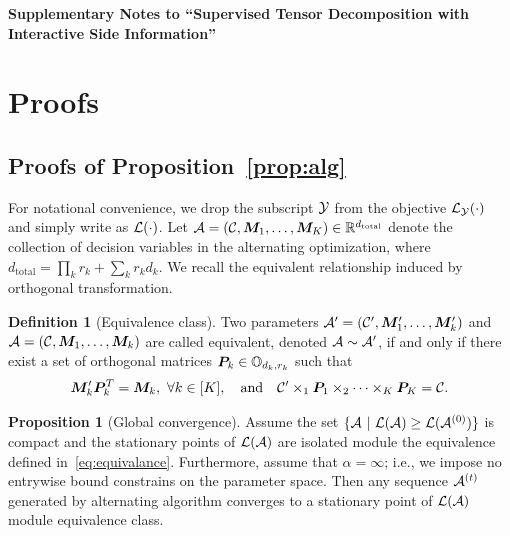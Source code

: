 \documentclass[12pt]{article}
\theoremstyle{definition}
\newtheorem{prop}{Proposition}
\theoremstyle{definition}
\newtheorem{defn}{Definition}
\begin{document}
\def\spacingset#1{\renewcommand{\baselinestretch}%
{#1}\small\normalsize} \spacingset{1.5}



\begin{center}
{\Large\bf Supplementary Notes to ``Supervised Tensor Decomposition
with Interactive Side Information''}
\end{center}

\appendix
\renewcommand{\thefigure}{S\arabic{figure}}
\setcounter{figure}{0}   

\section{Proofs}\label{sec:appedix}


\subsection{Proofs of Proposition~\ref{prop:alg}}\label{sec:SAlgorithm}
For notational convenience, we drop the subscript $\mathcal{Y}$ from the objective $\mathcal{L}_{\mathcal{Y}}(\cdot)$ and simply write as $\mathcal{L}(\cdot)$. Let $\mathcal{A} = (\mathcal{C}, \bm M_1,\ldots,\bm M_K) \in \mathbb{R}^{d_{\text{total}}}$ denote the collection of decision variables in the alternating optimization, where $d_{\text{total}} = \prod_k r_k + \sum_k r_kd_k$. We recall the equivalent relationship induced by orthogonal transformation.  

\begin{defn}[Equivalence class]
Two parameters $\mathcal{A}'=(\mathcal{C}', \bm M'_1,\ldots,\bm M'_k)$ and $\mathcal{A}=(\mathcal{C}, \bm M_1,\ldots,\bm M_k)$ are called equivalent, denoted $\mathcal{A}\sim \mathcal{A}'$, if and only if there exist a set of orthogonal matrices $\bm{P}_k \in \mathbb{O}_{d_k,r_k}$ such that
\begin{align}\label{eq:equivalance}
	\bm M'_k \bm{P}^T_k = \bm M_k ,\ \forall k \in [K], \quad \text{and}\quad \mathcal{C}' \times_1 \bm{P}_1 \times_2  \dots \times_K \bm{P}_K = \mathcal{C}.
\end{align}
\end{defn}

\begin{prop}[Global convergence]
Assume the set $\{\mathcal{A}\ |\ \mathcal{L}(\mathcal{A}) \geq \mathcal{L}(\mathcal{A}^{(0)}) \}$ is compact and the stationary points of $\mathcal{L}(\mathcal{A})$ are isolated module the equivalence defined in~\eqref{eq:equivalance}. Furthermore, assume that $\alpha = \infty$; i.e., we impose no entrywise bound constrains on the parameter space. Then any sequence $\mathcal{A}^{(t)}$ generated by alternating algorithm converges to a stationary point of $\mathcal{L}(\mathcal{A})$ module equivalence class.
\end{prop}
\end{document}
